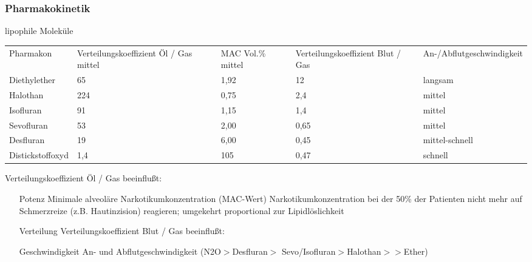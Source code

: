 \documentclass[10pt,a4paper]{report}
\begin{document}
\subsubsection{Pharmakokinetik} %
\label{ssub:pharmakokinetik}
lipophile Moleküle \\
\begin{tabularx}{\textwidth}{XXXXX}
Pharmakon&Verteilungskoeffizient Öl / Gas mittel&MAC Vol.\% mittel&Verteilungskoeffizient Blut / Gas&An-/Abflutgeschwindigkeit\\
Diethylether&65&1,92&12&langsam\\
Halothan&224&0,75&2,4&mittel\\
Isofluran&91&1,15&1,4&mittel\\
Sevofluran&53&2,00&0,65&mittel\\
Desfluran&19&6,00&0,45&mittel-schnell\\
Distickstoffoxyd&1,4&105&0,47&schnell\\
\end{tabularx}
Verteilungskoeffizient Öl / Gas beeinflußt:
\begin{itemize}
	\item[Potenz] Minimale alveoläre Narkotikumkonzentration (MAC-Wert)
	Narkotikumkonzentration bei der 50\% der Patienten nicht  mehr auf Schmerzreize (z.B. Hautinzision) reagieren; umgekehrt proportional zur Lipidlöslichkeit
	\item[Verteilung] Verteilungskoeffizient Blut / Gas beeinflußt:
	\item[Geschwindigkeit]An- und Abflutgeschwindigkeit (N2O$>$Desfluran$>$ Sevo/Isofluran$>$Halothan$>$$>$Ether)
\end{itemize}
\end{document}

